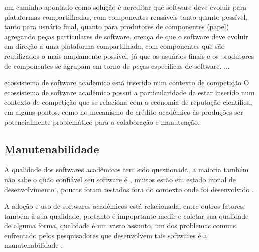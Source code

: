 um caminho apontado como solução é acreditar que software deve evoluir para plataformas compartilhadas,
com componentes reusáveis tanto quanto possível, tanto para usuário final, quanto
para produtores de componentes (papel) agregando peças particulares de software,
crença de que o software deve evoluir em direção a uma plataforma
compartilhada, com componentes que são reutilizados o mais amplamente possível,
já que os usuários finais e os produtores de componentes se agrupam em torno de
peças específicas de software.
...

ecossistema de software acadêmico está inserido num contexto de competição
O ecossistema de software acadêmico possui a particularidade de estar inserido
num contexto de competição que se relaciona com a economia de reputação
científica, em alguns pontos, como no mecanismo de crédito acadêmico às
produções ser potencialmente problemático para a colaboração e manutenção.

\subsection{Manutenabilidade}

A qualidade dos softwares acadêmicos tem sido questionada,
a maioria também não sabe o quão confiável seu software é \cite{Merali2010Computational},
muitos estão em estado inicial de desenvolvimento \cite{marshall2013tools},
poucas foram testados fora do contexto onde foi desenvolvido \cite{Portillo12}.

%

A adoção e uso de softwares acadêmicos está relacionada, entre outros fatores,
também à sua qualidade, portanto é impoprtante medir e coletar sua qualidade de
alguma forma, qualidade é um vasto assunto, um dos problemas comuns enfrentado
pelos pesquisadores que desenvolvem tais softwares é a manutenabilidade
\cite{Prlic2012}.

